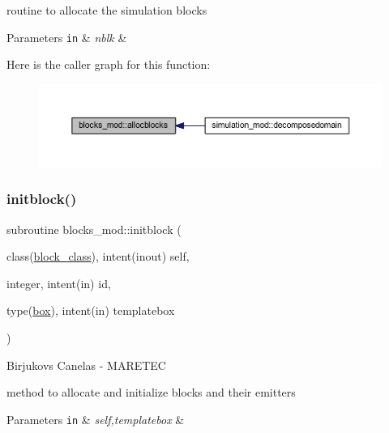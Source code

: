 routine to allocate the simulation blocks 
\begin{DoxyParams}[1]{Parameters}
\mbox{\tt in}  & {\em nblk} & \\
\hline
\end{DoxyParams}
Here is the caller graph for this function\+:
\nopagebreak
\begin{figure}[H]
\begin{center}
\leavevmode
\includegraphics[width=350pt]{namespaceblocks__mod_a639beb0fee2290d46353f4b4702d6711_icgraph}
\end{center}
\end{figure}
\mbox{\label{namespaceblocks__mod_a534ca69b17b6f54ee07f995b02feff39}} 
\subsubsection{\texorpdfstring{initblock()}{initblock()}}
{\footnotesize\ttfamily subroutine blocks\+\_\+mod\+::initblock (\begin{DoxyParamCaption}\item[{class(\hyperlink{structblocks__mod_1_1block__class}{block\+\_\+class}), intent(inout)}]{self,  }\item[{integer, intent(in)}]{id,  }\item[{type(\hyperlink{structgeometry__mod_1_1box}{box}), intent(in)}]{templatebox }\end{DoxyParamCaption})\hspace{0.3cm}{\ttfamily [private]}}



Birjukovs Canelas -\/ M\+A\+R\+E\+T\+EC 

method to allocate and initialize blocks and their emitters 
\begin{DoxyParams}[1]{Parameters}
\mbox{\tt in}  & {\em self,templatebox} & \\
\hline
\end{DoxyParams}
\mbox{\label{namespaceblocks__mod_a7585844eb1b43604c04cb7a24c56205e}} 
